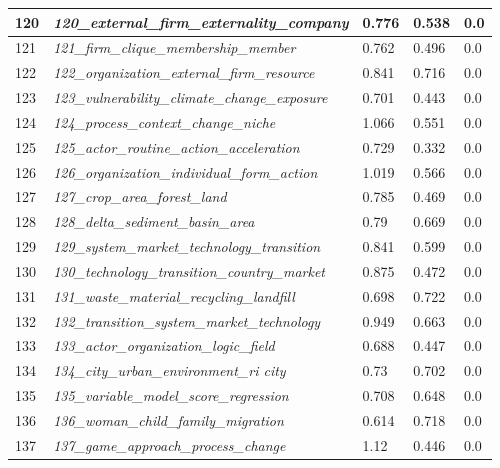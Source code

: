 \documentclass[12pt]{article}
\begin{document}
\begin{longtable}{|l|l|l|l|l|}
120 & \textit{120\_external\_firm\_externality\_company} & 0.776 & 0.538 & 0.0 \\ \hline
121 & \textit{121\_firm\_clique\_membership\_member} & 0.762 & 0.496 & 0.0 \\ \hline
122 & \textit{122\_organization\_external\_firm\_resource} & 0.841 & 0.716 & 0.0 \\ \hline
123 & \textit{123\_vulnerability\_climate\_change\_exposure} & 0.701 & 0.443 & 0.0 \\ \hline
124 & \textit{124\_process\_context\_change\_niche} & 1.066 & 0.551 & 0.0 \\ \hline
125 & \textit{125\_actor\_routine\_action\_acceleration} & 0.729 & 0.332 & 0.0 \\ \hline
126 & \textit{126\_organization\_individual\_form\_action} & 1.019 & 0.566 & 0.0 \\ \hline
127 & \textit{127\_crop\_area\_forest\_land} & 0.785 & 0.469 & 0.0 \\ \hline
128 & \textit{128\_delta\_sediment\_basin\_area} & 0.79 & 0.669 & 0.0 \\ \hline
129 & \textit{129\_system\_market\_technology\_transition} & 0.841 & 0.599 & 0.0 \\ \hline
130 & \textit{130\_technology\_transition\_country\_market} & 0.875 & 0.472 & 0.0 \\ \hline
131 & \textit{131\_waste\_material\_recycling\_landfill} & 0.698 & 0.722 & 0.0 \\ \hline
132 & \textit{132\_transition\_system\_market\_technology} & 0.949 & 0.663 & 0.0 \\ \hline
133 & \textit{133\_actor\_organization\_logic\_field} & 0.688 & 0.447 & 0.0 \\ \hline
134 & \textit{134\_city\_urban\_environment\_ri city} & 0.73 & 0.702 & 0.0 \\ \hline
135 & \textit{135\_variable\_model\_score\_regression} & 0.708 & 0.648 & 0.0 \\ \hline
136 & \textit{136\_woman\_child\_family\_migration} & 0.614 & 0.718 & 0.0 \\ \hline
137 & \textit{137\_game\_approach\_process\_change} & 1.12 & 0.446 & 0.0 \\ \hline
\end{longtable}


\end{document}
